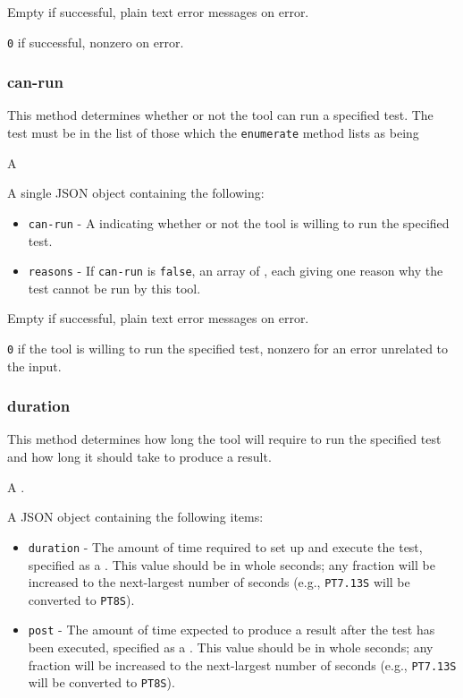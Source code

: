 \documentclass[10pt,titlepage]{article}
\begin{document}
 Empty if successful, plain text error
messages on error.

 {\tt 0} if successful, nonzero on error.



\subsubsection{can-run}
This method determines whether or not the tool can run a specified
test.  The test must be in the list of those which the {\tt enumerate}
method lists as being

 A 

 A single JSON object containing the
following:

\begin{itemize}
\item{\tt can-run} - A  indicating whether or not
  the tool is willing to run the specified test.
\item{\tt reasons} - If {\tt can-run} is {\tt false}, an array of
  , each giving one reason why the test cannot be run
  by this tool.
\end{itemize}

 Empty if successful, plain text error
messages on error.

 {\tt 0} if the tool is willing to run the
specified test, nonzero for an error unrelated to the input.



\subsubsection{duration}

This method determines how long the tool will require to run the
specified test and how long it should take to produce a result.

 A .

 A JSON object containing the following
items:

\begin{itemize}
\item{\tt duration} - The amount of time required to set up and
  execute the test, specified as a .  This value
  should be in whole seconds; any fraction will be increased to the
  next-largest number of seconds (e.g., {\tt PT7.13S} will be
  converted to {\tt PT8S}).
\item{\tt post} - The amount of time expected to produce a result
  after the test has been executed, specified as a
  .  This value should be in whole seconds; any
  fraction will be increased to the next-largest number of seconds
  (e.g., {\tt PT7.13S} will be converted to {\tt PT8S}).  
\end{itemize}
\end{document}
